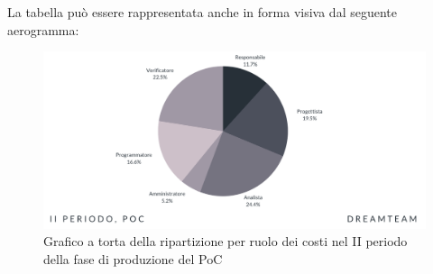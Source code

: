 La tabella può essere rappresentata anche in forma visiva dal seguente aerogramma:
\begin{figure}[!h]
\centering
\includegraphics[scale=0.65]{Sezioni/SezioniPreventivo/grafici/Poc_II_periodo_costi.png}
\caption{Grafico a torta della ripartizione per ruolo dei costi nel II periodo della fase di produzione del PoC}
\end{figure}



